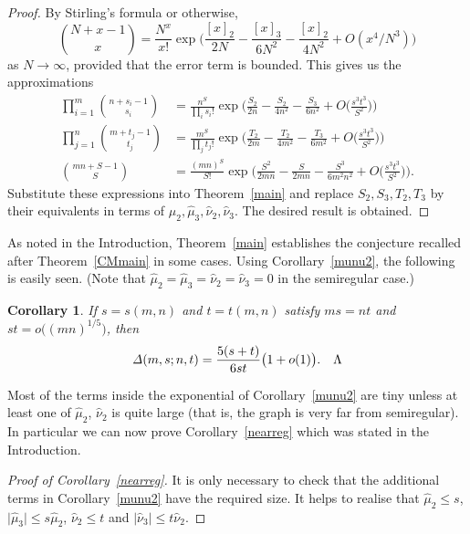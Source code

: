\documentclass[12pt]{article}
\newtheorem{corollary}[theorem]{Corollary}
\numberwithin{equation}{section}
\def\({\bigl(}   \def\){\bigr)}
\def\abs#1{\mathopen|#1\mathclose|} \let\card=\abs
\def\ff#1#2{[#1]_{#2}}
\def\Deltait{{\mathit{\Delta}}}
\begin{document}
\begin{proof}
By Stirling's formula or otherwise,
$$\binom{N{+}x{-}1}{x} = \frac{N^x}{x!}\exp\biggl(
    \frac{\ff x2}{2N} -  \frac{\ff x3}{6N^2}  -  \frac{\ff x2}{4N^2} +
        O(x^4/N^3)\biggr)$$
as $N\to\infty$, provided that the error term is bounded. 
This gives us the approximations
\begin{align*}
  \prod_{i=1}^{m} \binom{n{+}s_i{-}1}{s_i} &= \frac{n^S}{\prod_i s_i!}
     \exp\biggl( \frac{S_2}{2n} - \frac{S_2}{4n^2} - \frac{S_3}{6n^2}
     + O\biggl(\frac{s^3t^3}{S^2}\biggr)\biggr)\\[0.4ex]
  \prod_{j=1}^{n} \binom{m{+}t_j{-}1}{t_j} &= \frac{m^S}{\prod_j t_j!}
     \exp\biggl( \frac{T_2}{2m} - \frac{T_2}{4m^2} - \frac{T_3}{6m^2}
     + O\biggl(\frac{s^3t^3}{S^2}\biggr)\biggr)\\[0.4ex]
  \binom{mn{+}S{-}1}{S} &= \frac{(mn)^S}{S!}
     \exp\biggl( \frac{S^2}{2mn} - \frac{S}{2mn} - \frac{S^3}{6m^2n^2}
     + O\biggl(\frac{s^3t^3}{S^2}\biggr)\biggr).
\end{align*}
Substitute these expressions into Theorem~\ref{main}
and replace $S_2, S_3, T_2, T_3$ by their equivalents in terms of
$\hat{\mu}_2,\hat{\mu}_3,\hat{\nu}_2,\hat{\nu}_3$.
The desired result is obtained.
\end{proof}

\medskip

As noted in the Introduction, Theorem~\ref{main} establishes the
conjecture recalled after Theorem~\ref{CMmain} in some cases.
Using Corollary~\ref{munu2}, the following is easily seen.
(Note that $\hat{\mu}_2 = \hat{\mu}_3 = \hat{\nu}_2 = \hat{\nu}_3 = 0$ 
in the semiregular case.)

\begin{corollary}\label{Delta}
 If\/ $s=s(m,n)$ and $t=t(m,n)$ satisfy $ms=nt$ and
 $st=o\((mn)^{1/5}\)$, then
 \[ \Deltait(m,s;n,t)
   = \frac{5(s+t)}{6st}\(1+o(1)\).
        \quad\qedsymbol \]
\end{corollary}

Most of the terms inside the exponential of Corollary~\ref{munu2}
are tiny unless at least one of
$\hat{\mu}_2$, $\hat{\nu}_2$ 
is quite large (that is, the graph is very far from
semiregular).  In particular we can now prove Corollary~\ref{nearreg}
which was stated in the Introduction.

\begin{proof}[Proof of Corollary~\ref{nearreg}]
It is only necessary to check that the additional terms in
Corollary~\ref{munu2} have the required size.
It helps to realise that $\hat{\mu}_2\le s$,
$\abs{\hat{\mu}_3}\le s\hat{\mu}_2$, $\hat{\nu}_2\le t$
and $\abs{\hat{\nu}_3}\le t\hat{\nu}_2$.
\end{proof}
\end{document}
